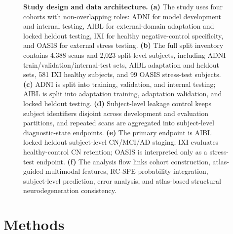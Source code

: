 \documentclass[12pt,a4paper]{article}
\begin{document}
\begin{figure}[p]
    \centering
    \caption{\textbf{Study design and data architecture.} \textbf{(a)} The study uses four cohorts with non-overlapping roles: ADNI for model development and internal testing, AIBL for external-domain adaptation and locked heldout testing, IXI for healthy negative-control specificity, and OASIS for external stress testing. \textbf{(b)} The full split inventory contains 4{,}388 scans and 2{,}023 split-level subjects, including ADNI train/validation/internal-test sets, AIBL adaptation and heldout sets, 581 IXI healthy subjects, and 99 OASIS stress-test subjects. \textbf{(c)} ADNI is split into training, validation, and internal testing; AIBL is split into adaptation training, adaptation validation, and locked heldout testing. \textbf{(d)} Subject-level leakage control keeps subject identifiers disjoint across development and evaluation partitions, and repeated scans are aggregated into subject-level diagnostic-state endpoints. \textbf{(e)} The primary endpoint is AIBL locked heldout subject-level CN/MCI/AD staging; IXI evaluates healthy-control CN retention; OASIS is interpreted only as a stress-test endpoint. \textbf{(f)} The analysis flow links cohort construction, atlas-guided multimodal features, RC-SPE probability integration, subject-level prediction, error analysis, and atlas-based structural neurodegeneration consistency.}
    \label{fig:v6_framework}
\end{figure}


\section{Methods}
\label{sec:methods}
\end{document}
